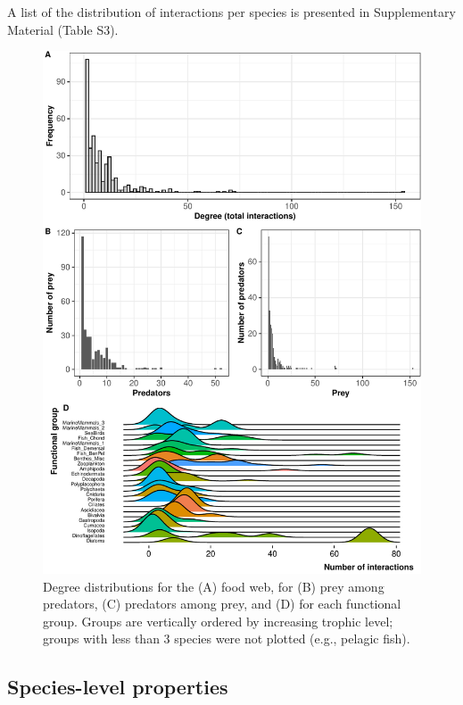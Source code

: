 \documentclass[preprint, 3p,
authoryear]{elsarticle} %
\begin{document}
A list of the distribution of interactions per species is presented in
Supplementary Material (Table S3).

\begin{figure}

{\centering \includegraphics{MS_Burdwood_foodweb_files/figure-latex/figure3-1} 

}

\caption{Degree distributions for the (A) food web, for (B) prey among predators, (C) predators among prey, and (D) for each functional group. Groups are vertically ordered by increasing trophic level; groups with less than 3 species were not plotted (e.g., pelagic fish).}\label{fig:figure3}
\end{figure}

\hypertarget{species-level-properties}{%
\subsection{Species-level properties}\label{species-level-properties}}
\end{document}
